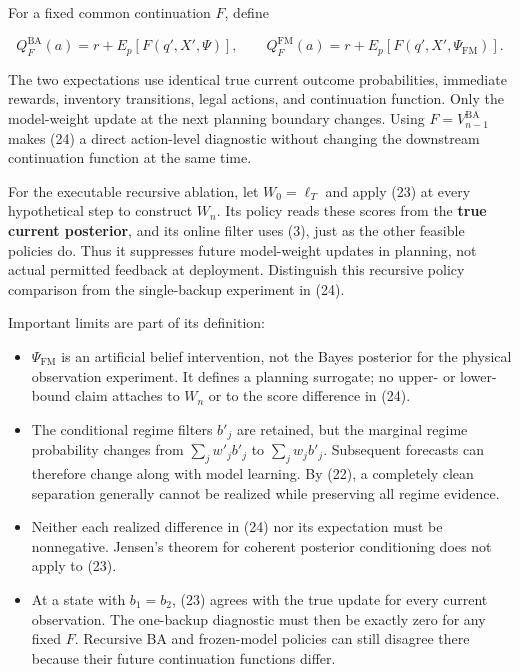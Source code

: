\documentclass[10pt,a4paper]{article}
\begin{document}
For a fixed common continuation $F$, define

\begin{equation}
Q_{F}^{\mathrm{BA}}(a)=r+E_p[F(q',X',\Psi)],\qquad
Q_{F}^{\mathrm{FM}}(a)=r+E_p[F(q',X',\Psi_{\mathrm{FM}})].
\tag{24}
\end{equation}

The two expectations use identical true current outcome probabilities,
immediate rewards, inventory transitions, legal actions, and continuation
function. Only the model-weight update at the next planning boundary changes.
Using $F=V^{\mathrm{BA}}_{n-1}$ makes (24) a direct action-level diagnostic
without changing the downstream continuation function at the same time.

For the executable recursive ablation, let $W_0=\ell_T$ and apply (23) at
every hypothetical step to construct $W_n$. Its policy reads these scores
from the \textbf{true current posterior}, and its online filter uses (3), just as
the other feasible policies do. Thus it suppresses future model-weight updates
in planning, not actual permitted feedback at deployment. Distinguish this
recursive policy comparison from the single-backup experiment in (24).

Important limits are part of its definition:

\begin{itemize}
\item $\Psi_{\mathrm{FM}}$ is an artificial belief intervention, not the Bayes
  posterior for the physical observation experiment. It defines a planning
  surrogate; no upper- or lower-bound claim attaches to $W_n$ or to the
  score difference in (24).
\item The conditional regime filters $b'_j$ are retained, but the marginal
  regime probability changes from $\sum_jw'_jb'_j$ to
  $\sum_jw_jb'_j$. Subsequent forecasts can therefore change along with
  model learning. By (22), a completely clean separation generally cannot be
  realized while preserving all regime evidence.
\item Neither each realized difference in (24) nor its expectation must be
  nonnegative. Jensen's theorem for coherent posterior conditioning does not
  apply to (23).
\item At a state with $b_1=b_2$, (23) agrees with the true update for every
  current observation. The one-backup diagnostic must then be exactly zero
  for any fixed $F$. Recursive BA and frozen-model policies can still
  disagree there because their future continuation functions differ.
\end{itemize}
\end{document}
